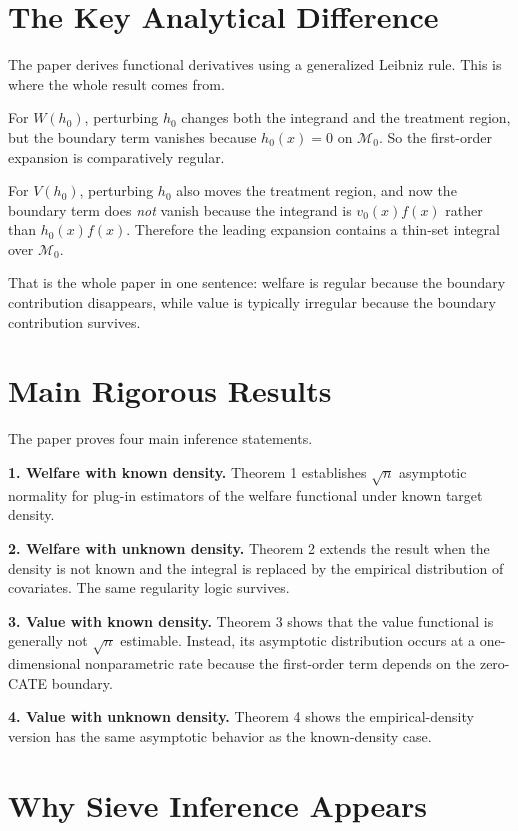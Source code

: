 \documentclass[11pt]{article}
\begin{document}
\section{The Key Analytical Difference}

The paper derives functional derivatives using a generalized Leibniz rule. This is where the whole result comes from.

For $W(h_0)$, perturbing $h_0$ changes both the integrand and the treatment region, but the boundary term vanishes because $h_0(x)=0$ on $\mathcal M_0$. So the first-order expansion is comparatively regular.

For $V(h_0)$, perturbing $h_0$ also moves the treatment region, and now the boundary term does \emph{not} vanish because the integrand is $v_0(x)f(x)$ rather than $h_0(x)f(x)$. Therefore the leading expansion contains a thin-set integral over $\mathcal M_0$.

That is the whole paper in one sentence: welfare is regular because the boundary contribution disappears, while value is typically irregular because the boundary contribution survives.

\section{Main Rigorous Results}

The paper proves four main inference statements.

\textbf{1. Welfare with known density.}
Theorem 1 establishes $\sqrt n$ asymptotic normality for plug-in estimators of the welfare functional under known target density.

\textbf{2. Welfare with unknown density.}
Theorem 2 extends the result when the density is not known and the integral is replaced by the empirical distribution of covariates. The same regularity logic survives.

\textbf{3. Value with known density.}
Theorem 3 shows that the value functional is generally not $\sqrt n$ estimable. Instead, its asymptotic distribution occurs at a one-dimensional nonparametric rate because the first-order term depends on the zero-CATE boundary.

\textbf{4. Value with unknown density.}
Theorem 4 shows the empirical-density version has the same asymptotic behavior as the known-density case.

\section{Why Sieve Inference Appears}
\end{document}
